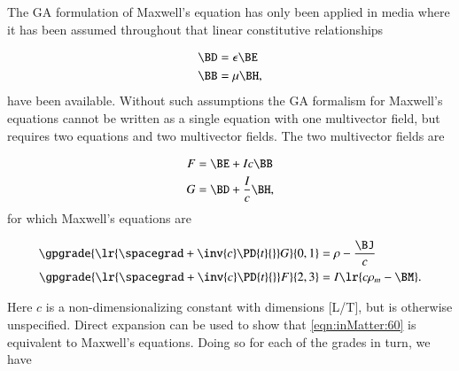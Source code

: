 %
%
The GA formulation of Maxwell's equation has only been applied in media where it has been assumed throughout that linear constitutive relationships

\begin{dmath}\label{eqn:inMatter:20}
\begin{aligned}
\BD &= \epsilon \BE \\
\BB &= \mu \BH,
\end{aligned}
\end{dmath}
have been available.  Without such assumptions the GA formalism for Maxwell's equations cannot be written as a single equation with one multivector field, but requires two equations and two multivector fields.  The two multivector fields are

\begin{dmath}\label{eqn:inMatter:40}
\begin{aligned}
F &= \BE + I c \BB \\
G &= \BD + \frac{I}{c} \BH,
\end{aligned}
\end{dmath}
for which Maxwell's equations are

\begin{dmath}\label{eqn:inMatter:60}
\begin{aligned}
\gpgrade{ \lr{ \spacegrad + \inv{c} \PD{t}{} } G }{0,1} &= \rho - \frac{\BJ}{c} \\
\gpgrade{ \lr{ \spacegrad + \inv{c} \PD{t}{} } F }{2,3} &= I \lr{ c \rho_m - \BM }.
\end{aligned}
\end{dmath}

Here \( c \) is a non-dimensionalizing constant with dimensions [L/T], but is otherwise unspecified.
Direct expansion can be used to show that \cref{eqn:inMatter:60} is equivalent to Maxwell's equations.
Doing so for each of the grades in turn, we have

